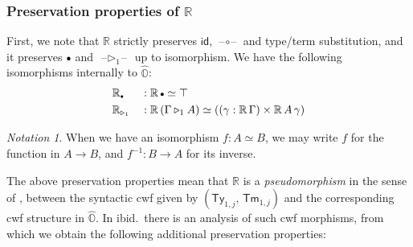 \documentclass[acmsmall]{acmart}
\newcommand{\msf}[1]{\mathsf{#1}}
\newcommand{\mbb}[1]{\mathbb{#1}}
\newcommand{\ext}{\triangleright}
\newcommand{\mbbo}{\mbb{O}}
\newcommand{\Ty}{\msf{Ty}}
\newcommand{\Tm}{\msf{Tm}}
\newcommand{\emptycon}{\scaleobj{.75}\bullet}
\newcommand{\id}{\msf{id}}
\newcommand{\blank}{{\mathord{\hspace{1pt}\text{--}\hspace{1pt}}}}
\newcommand{\hato}{\bm\hat{\mbbo}}
\newcommand{\re}{\mbb{R}}
\theoremstyle{remark}
\newtheorem{notation}{Notation}
\begin{document}
\subsubsection{Preservation properties of $\re$}
First, we note that $\re$ strictly preserves $\id$, $\blank\circ\blank$ and
type/term substitution, and it preserves $\emptycon$ and $\blank\ext_1\blank$ up
to isomorphism. We have the following isomorphisms internally to $\hato$:
\begin{alignat*}{3}
  & \re_{\emptycon} &&: \re\,\emptycon \simeq \top \\
  & \re_{\ext_1}   &&: \re\,(\Gamma \ext_1 A) \simeq ((\gamma : \re\,\Gamma) \times \re\,A\,\gamma)
\end{alignat*}
\begin{notation}
  When we have an isomorphism $f : A \simeq B$, we may write $f$ for the
  function in $A \to B$, and $f^{-1} : B \to A$ for its inverse.
\end{notation}
The above preservation properties mean that $\re$ is a \emph{pseudomorphism} in
the sense of \cite{gluing}, between the syntactic cwf given by
$(\Ty_{1,j},\,\Tm_{1,j})$ and the corresponding cwf structure in $\hato$. In
ibid.\ there is an analysis of such cwf morphisms, from which we obtain the
following additional preservation properties:
\end{document}
